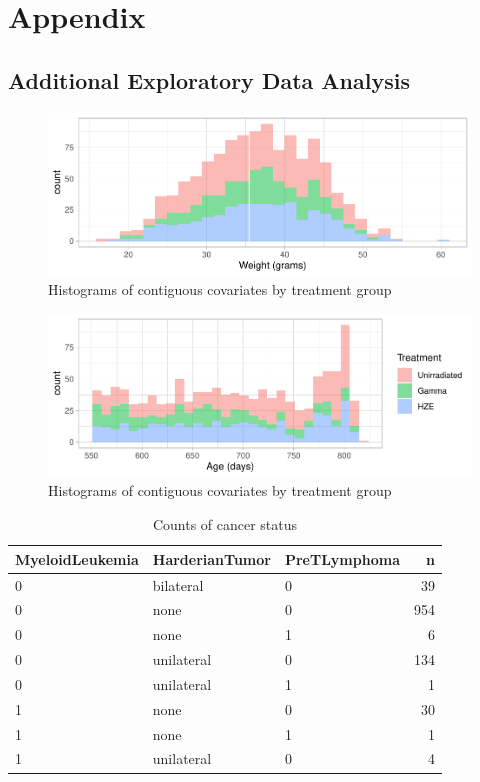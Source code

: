 \documentclass[12pt]{article}
\begin{document}
\newpage

\appendix

\section{Appendix}

\hypertarget{additional-exploratory-data-analysis}{%
\subsection{Additional Exploratory Data Analysis}\label{additional-exploratory-data-analysis}}

\label{sec:appeda}

\begin{figure}[H]

{\centering \includegraphics[width=0.42\linewidth]{bookdown_report_files/figure-latex/eda-1} 

}

\caption{Histograms of contiguous covariates by treatment group}\label{fig:eda-1}
\end{figure}
\begin{figure}[H]

{\centering \includegraphics[width=0.42\linewidth]{bookdown_report_files/figure-latex/eda-2} 

}

\caption{Histograms of contiguous covariates by treatment group}\label{fig:eda-2}
\end{figure}

\begin{table}[!h]
\centering
\begin{tabular}{lllr}
  \toprule
MyeloidLeukemia & HarderianTumor & PreTLymphoma & n \\ 
  \midrule
0 & bilateral & 0 &  39 \\ 
  0 & none & 0 & 954 \\ 
  0 & none & 1 &   6 \\ 
  0 & unilateral & 0 & 134 \\ 
  0 & unilateral & 1 &   1 \\ 
  1 & none & 0 &  30 \\ 
  1 & none & 1 &   1 \\ 
  1 & unilateral & 0 &   4 \\ 
   \bottomrule
\end{tabular}
\caption{Counts of cancer status} 
\end{table}
\end{document}

